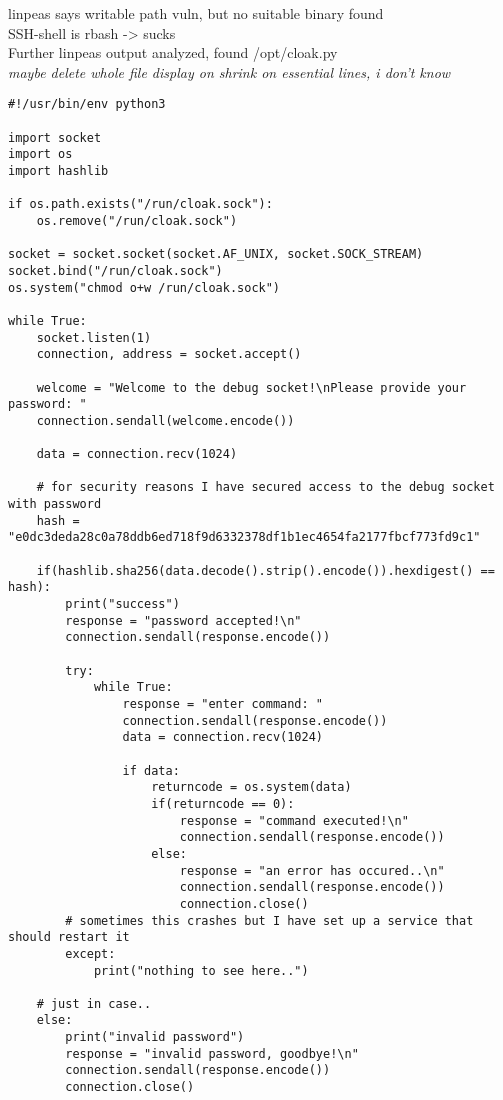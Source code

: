 \documentclass[titlepage]{article} %
\begin{document}
linpeas says writable path vuln, but no suitable binary found\\
SSH-shell is rbash -> sucks\\


\newpage
Further linpeas output analyzed, found /opt/cloak.py \\
\textit{maybe delete whole file display on shrink on essential lines, i don't know}

\begin{verbatim}
#!/usr/bin/env python3

import socket
import os
import hashlib

if os.path.exists("/run/cloak.sock"):
    os.remove("/run/cloak.sock")

socket = socket.socket(socket.AF_UNIX, socket.SOCK_STREAM)
socket.bind("/run/cloak.sock")
os.system("chmod o+w /run/cloak.sock")

while True:
    socket.listen(1) 
    connection, address = socket.accept()

    welcome = "Welcome to the debug socket!\nPlease provide your password: "
    connection.sendall(welcome.encode())

    data = connection.recv(1024)

    # for security reasons I have secured access to the debug socket with password
    hash = "e0dc3deda28c0a78ddb6ed718f9d6332378df1b1ec4654fa2177fbcf773fd9c1"

    if(hashlib.sha256(data.decode().strip().encode()).hexdigest() == hash):
        print("success")
        response = "password accepted!\n"
        connection.sendall(response.encode())

        try:
            while True:
                response = "enter command: "
                connection.sendall(response.encode())
                data = connection.recv(1024)

                if data:
                    returncode = os.system(data)
                    if(returncode == 0):
                        response = "command executed!\n"
                        connection.sendall(response.encode())
                    else:
                        response = "an error has occured..\n"
                        connection.sendall(response.encode())
                        connection.close()
        # sometimes this crashes but I have set up a service that should restart it
        except:
            print("nothing to see here..")

    # just in case..
    else:
        print("invalid password")
        response = "invalid password, goodbye!\n"
        connection.sendall(response.encode())
        connection.close()
\end{verbatim}
\end{document}
